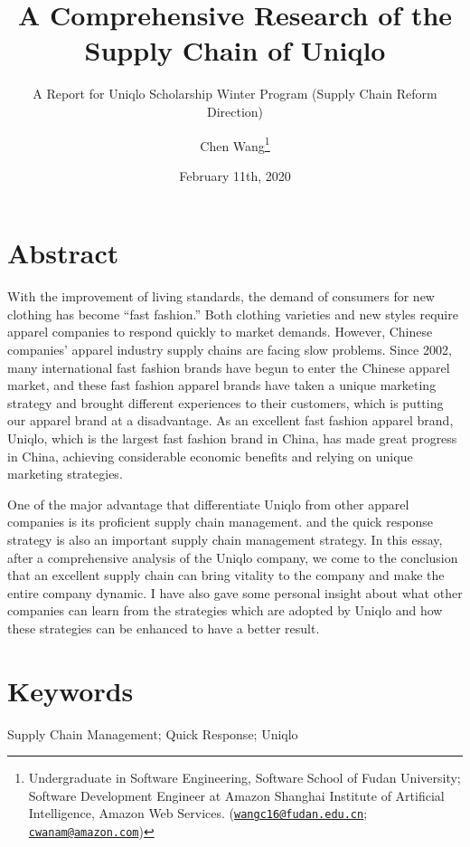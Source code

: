 \documentclass[12pt,]{article}
\title{\vspace{3in} A Comprehensive Research of the Supply Chain of Uniqlo}
\subtitle{A Report for Uniqlo Scholarship Winter Program (Supply Chain Reform
Direction)}
\author{Chen Wang\footnote{Undergraduate in Software Engineering, Software
  School of Fudan University; Software Development Engineer at Amazon
  Shanghai Institute of Artificial Intelligence, Amazon Web Services.
  (\href{mailto:wangc16@fudan.edu.cn}{\nolinkurl{wangc16@fudan.edu.cn}};
  \href{mailto:cwanam@amazon.com}{\nolinkurl{cwanam@amazon.com}})}}
\date{February 11th, 2020}
\begin{document}
\maketitle

\newpage

\large

\hypertarget{abstract}{%
\section*{Abstract}\label{abstract}}

With the improvement of living standards, the demand of consumers for
new clothing has become ``fast fashion.'' Both clothing varieties and
new styles require apparel companies to respond quickly to market
demands. However, Chinese companies' apparel industry supply chains are
facing slow problems. Since 2002, many international fast fashion brands
have begun to enter the Chinese apparel market, and these fast fashion
apparel brands have taken a unique marketing strategy and brought
different experiences to their customers, which is putting our apparel
brand at a disadvantage. As an excellent fast fashion apparel brand,
Uniqlo, which is the largest fast fashion brand in China, has made great
progress in China, achieving considerable economic benefits and relying
on unique marketing strategies.

One of the major advantage that differentiate Uniqlo from other apparel
companies is its proficient supply chain management. and the quick
response strategy is also an important supply chain management strategy.
In this essay, after a comprehensive analysis of the Uniqlo company, we
come to the conclusion that an excellent supply chain can bring vitality
to the company and make the entire company dynamic. I have also gave
some personal insight about what other companies can learn from the
strategies which are adopted by Uniqlo and how these strategies can be
enhanced to have a better result.

\hypertarget{keywords}{%
\section*{Keywords}\label{keywords}}

Supply Chain Management; Quick Response; Uniqlo

\normalsize

\newpage

\tableofcontents
\end{document}
